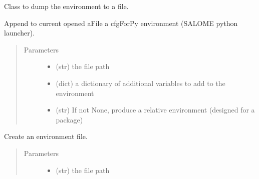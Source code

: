 \documentclass[a4paper,10pt,english]{sphinxmanual}
\begin{document}

\begin{fulllineitems}
\label{\detokenize{apidoc_src/src:src.environment.FileEnvWriter}}
Class to dump the environment to a file.

\begin{fulllineitems}
\label{\detokenize{apidoc_src/src:src.environment.FileEnvWriter.write_cfgForPy_file}}
Append to current opened aFile a cfgForPy 
environment (SALOME python launcher).
\begin{quote}\begin{description}
\item[{Parameters}] \leavevmode\begin{itemize}
\item {} 
 \textendash{} (str) the file path

\item {} 
 \textendash{} (dict) 
a dictionary of additional variables to add to the environment

\item {} 
 \textendash{} (str) 
If not None, produce a relative environment 
(designed for a package)

\end{itemize}

\end{description}\end{quote}

\end{fulllineitems}


\begin{fulllineitems}
\label{\detokenize{apidoc_src/src:src.environment.FileEnvWriter.write_env_file}}
Create an environment file.
\begin{quote}\begin{description}
\item[{Parameters}] \leavevmode\begin{itemize}
\item {} 
 \textendash{} (str) the file path


\end{itemize}
\end{description}
\end{quote}
\end{fulllineitems}
\end{fulllineitems}
\end{document}
